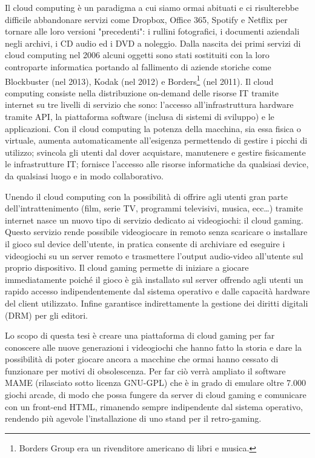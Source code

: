 Il cloud computing è un paradigma a cui siamo ormai abituati e ci risulterebbe difficile abbandonare servizi come Dropbox, Office 365, Spotify e Netflix per tornare alle loro versioni "precedenti": i rullini fotografici, i documenti aziendali negli archivi, i CD audio ed i DVD a noleggio. Dalla nascita dei primi servizi di cloud computing nel 2006 alcuni oggetti sono stati sostituiti con la loro controparte informatica portando al fallimento di aziende storiche come Blockbuster (nel 2013), Kodak (nel 2012) e Borders\footnote{Borders Group era un rivenditore americano di libri e musica.} (nel 2011)\cite{I_4_fallimenti_più_clamorosi_del_decennio}. Il cloud computing consiste nella distribuzione on-demand delle risorse IT tramite internet su tre livelli di servizio che sono: l'accesso all'infrastruttura hardware tramite API, la piattaforma software (inclusa di sistemi di sviluppo) e le applicazioni. Con il cloud computing la potenza della macchina, sia essa fisica o virtuale, aumenta automaticamente all'esigenza permettendo di gestire i picchi di utilizzo; svincola gli utenti dal dover acquistare, manutenere e gestire fisicamente le infrastrutture IT; fornisce l'accesso alle risorse informatiche da qualsiasi device, da qualsiasi luogo e in modo collaborativo.

Unendo il cloud computing con la possibilità di offrire agli utenti gran parte dell'intrattenimento (film, serie TV, programmi televisivi, musica, ecc\dots) tramite internet nasce un nuovo tipo di servizio dedicato ai videogiochi: il cloud gaming. Questo servizio rende possibile videogiocare in remoto senza scaricare o installare il gioco sul device dell'utente, in pratica consente di archiviare ed eseguire i videogiochi su un server remoto e trasmettere l'output audio-video all'utente sul proprio dispositivo. Il cloud gaming permette di iniziare a giocare immediatamente poiché il gioco è già installato sul server offrendo agli utenti un rapido accesso indipendentemente dal sistema operativo e dalle capacità hardware del client utilizzato. Infine garantisce indirettamente la gestione dei diritti digitali (DRM) per gli editori.

Lo scopo di questa tesi è creare una piattaforma di cloud gaming per far conoscere alle nuove generazioni i videogiochi che hanno fatto la storia e dare la possibilità di poter giocare ancora a macchine che  ormai hanno cessato di funzionare per motivi di obsolescenza. Per far ciò verrà ampliato il software MAME (rilasciato sotto licenza GNU-GPL) che è in grado di emulare oltre 7.000 giochi arcade, di modo che possa fungere da server di cloud gaming e comunicare con un front-end HTML, rimanendo sempre indipendente dal sistema operativo, rendendo più agevole l’installazione di uno stand per il retro-gaming.

